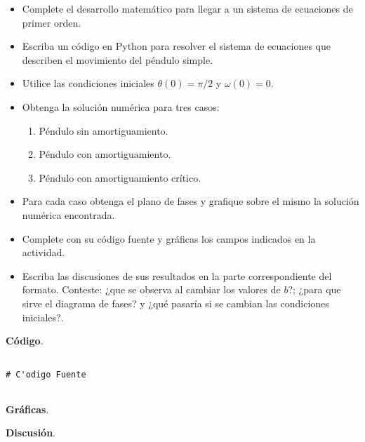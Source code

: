 \documentclass[11pt,letterpaper]{article}
\begin{document}
\begin{itemize}
\item Complete el desarrollo matemático para llegar a un sistema de ecuaciones de primer orden.
\item  Escriba un código en Python para resolver el sistema de ecuaciones que describen el movimiento del péndulo simple.
\item Utilice las condiciones iniciales $\theta(0) = \pi/2$ y $\omega(0) = 0$.
\item Obtenga la solución numérica para tres casos: 
\begin{enumerate}
\item Péndulo sin amortiguamiento.
\item Péndulo con amortiguamiento.
\item Péndulo con amortiguamiento crítico.
\end{enumerate}
\item Para cada caso obtenga el plano de fases y grafique sobre el mismo la solución numérica encontrada.
\item Complete con su código fuente y gráficas los campos indicados en la actividad.
\item Escriba las discusiones de sus resultados en la parte correspondiente del formato. Conteste: ¿que se observa al cambiar los valores de $b$?; ¿para que sirve el diagrama de fases? y ¿qué pasaría si se cambian las condiciones iniciales?.
\end{itemize}
 
\newpage

\begin{tcolorbox}[colback=white]
\textbf{Código}.
\tcblower

\begin{lstlisting}

# C'odigo Fuente


\end{lstlisting}

\end{tcolorbox}


\begin{tcolorbox}[colback=white]
\textbf{Gráficas}.
\tcblower

\centering

\end{tcolorbox}

\begin{tcolorbox}[colback=white]
\textbf{Discusión}.
\tcblower


\end{tcolorbox}
\end{document}
